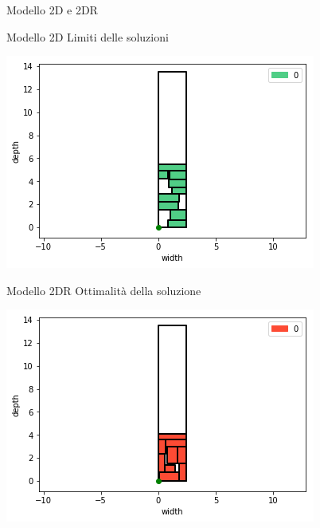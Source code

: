 \documentclass{beamer}
\begin{document}
\begin{frame}{Modello 2D e 2DR}
												
	\begin{minipage}[c]{0.45\textwidth}
		\begin{alertblock}{Modello 2D}
			Limiti delle soluzioni
		\end{alertblock}	
	\end{minipage}
	\hfill
	\begin{minipage}[c]{0.45\textwidth}
		\includegraphics[width=1\linewidth]{figures/general2D}
	\end{minipage}
							
	\begin{minipage}[c]{0.45\textwidth}
		\begin{alertblock}{Modello 2DR}
			Ottimalit\`a della soluzione
		\end{alertblock}	
	\end{minipage}
	\hfill
	\begin{minipage}[c]{0.45\textwidth}
		\includegraphics[width=1\linewidth]{figures/general2DR}
	\end{minipage}
\end{frame}
\end{document}
